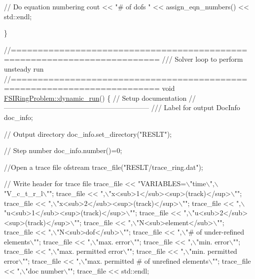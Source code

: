 \begin{DoxyCodeInclude}
{ \textcolor{comment}{// Do equation numbering}
 cout << \textcolor{stringliteral}{"# of dofs "} << assign\_eqn\_numbers() << std::endl;
 
\}


\textcolor{comment}{//=========================================================================}\textcolor{comment}{}
\textcolor{comment}{/// Solver loop to perform unsteady run}
\textcolor{comment}{}\textcolor{comment}{//=========================================================================}
\textcolor{keywordtype}{void} \hyperlink{classFSIRingProblem_acbb3bc5cd6d16cfee7a2f19a3b984ce7}{FSIRingProblem::dynamic\_run}()
\{
 \textcolor{comment}{// Setup documentation}
 \textcolor{comment}{//---------------------------------------------------------------}
\textcolor{comment}{}
\textcolor{comment}{ /// Label for output}
\textcolor{comment}{} DocInfo doc\_info;

 \textcolor{comment}{// Output directory}
 doc\_info.set\_directory(\textcolor{stringliteral}{"RESLT"});

 \textcolor{comment}{// Step number}
 doc\_info.number()=0;

 \textcolor{comment}{//Open a trace file}
 ofstream trace\_file(\textcolor{stringliteral}{"RESLT/trace\_ring.dat"});
 
 \textcolor{comment}{// Write header for trace file}
 trace\_file << \textcolor{stringliteral}{"VARIABLES=\(\backslash\)"time\(\backslash\)",\(\backslash\)"V\_c\_t\_r\_l\(\backslash\)""};
 trace\_file << \textcolor{stringliteral}{",\(\backslash\)"x<sub>1</sub><sup>(track)</sup>\(\backslash\)""};
 trace\_file << \textcolor{stringliteral}{",\(\backslash\)"x<sub>2</sub><sup>(track)</sup>\(\backslash\)""};
 trace\_file << \textcolor{stringliteral}{",\(\backslash\)"u<sub>1</sub><sup>(track)</sup>\(\backslash\)""};
 trace\_file << \textcolor{stringliteral}{",\(\backslash\)"u<sub>2</sub><sup>(track)</sup>\(\backslash\)""};
 trace\_file << \textcolor{stringliteral}{",\(\backslash\)"N<sub>element</sub>\(\backslash\)""};
 trace\_file << \textcolor{stringliteral}{",\(\backslash\)"N<sub>dof</sub>\(\backslash\)""};
 trace\_file << \textcolor{stringliteral}{",\(\backslash\)"# of under-refined elements\(\backslash\)""};
 trace\_file << \textcolor{stringliteral}{",\(\backslash\)"max. error\(\backslash\)""};
 trace\_file << \textcolor{stringliteral}{",\(\backslash\)"min. error\(\backslash\)""};
 trace\_file << \textcolor{stringliteral}{",\(\backslash\)"max. permitted error\(\backslash\)""};
 trace\_file << \textcolor{stringliteral}{",\(\backslash\)"min. permitted error\(\backslash\)""};
 trace\_file << \textcolor{stringliteral}{",\(\backslash\)"max. permitted # of unrefined elements\(\backslash\)""};
 trace\_file << \textcolor{stringliteral}{",\(\backslash\)"doc number\(\backslash\)""};
 trace\_file << std::endl;
 

}
\end{DoxyCodeInclude}
